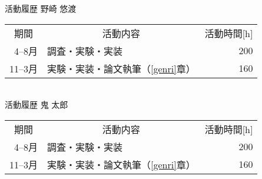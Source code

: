 

\thispagestyle{empty}

\begin{table}[tbp]
\large
\centering


	

{\gtfamily 活動履歴} 野崎 悠渡\\
\begin{tabular}{rlr}
\hline
\multicolumn{1}{c}{{\gtfamily 期間}}&
\multicolumn{1}{c}{{\gtfamily 活動内容}}&
\multicolumn{1}{c}{{\gtfamily 活動時間[h]}}
\\
4--8月 & 調査・実験・実装 & 200 \\
11--3月 & 実験・実装・論文執筆（\ref{genri}章） & 160\\
\hline
\end{tabular}\\
\vspace{2in}
{\gtfamily 活動履歴} 鬼 太郎\\
\begin{tabular}{rlr}
\hline
\multicolumn{1}{c}{{\gtfamily 期間}}&
\multicolumn{1}{c}{{\gtfamily 活動内容}}&
\multicolumn{1}{c}{{\gtfamily 活動時間[h]}}
\\
4--8月 & 調査・実験・実装 & 200 \\
11--3月 & 実験・実装・論文執筆（\ref{genri}章） & 160\\
\hline
\end{tabular}\\

\end{table}
\clearpage

